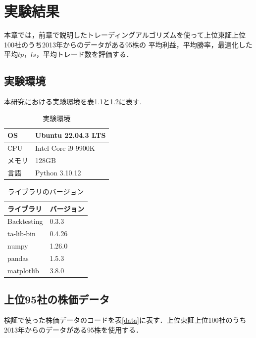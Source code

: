 \chapter{実験結果}
本章では，前章で説明したトレーディングアルゴリズムを使って上位東証上位100社のうち2013年からのデータがある95株の
平均利益，平均勝率，最適化した平均$tp$，$ls$，平均トレード数を評価する．
\section{実験環境}
本研究における実験環境を表\ref{env}と\ref{lib}に表す.

\begin{table}[hbtp]
 \centering
 \caption{実験環境}
  \label{env}
 \begin{tabular}{|l||l|}
   \hline
   OS & Ubuntu 22.04.3 LTS\\
   \hline
   CPU & Intel Core i9-9900K\\
   \hline
   メモリ & 128GB \\
   \hline
   言語 & Python 3.10.12 \\
   \hline
  \end{tabular}
\end{table}

\begin{table}[hbtp]
  \centering
  \caption{ライブラリのバージョン}
   \label{lib}
  \begin{tabular}{|l||l|}
    \hline
    \textbf{ライブラリ} & \textbf{バージョン}\\
    \hline
    Backtesting & 0.3.3\\
    \hline
    ta-lib-bin & 0.4.26\\
    \hline
    numpy & 1.26.0 \\
    \hline
    pandas & 1.5.3 \\
    \hline
    matplotlib & 3.8.0 \\
    \hline
   \end{tabular}
 \end{table}
\newpage
\section{上位95社の株価データ}

検証で使った株価データのコードを表\ref{data}に表す．上位東証上位100社のうち2013年からのデータがある95株を使用する．

